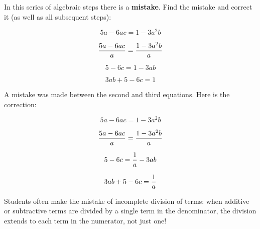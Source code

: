 

In this series of algebraic steps there is a {\bf mistake}.  Find the mistake and correct it (as well as all subsequent steps):

$$5a - 6ac = 1 - 3a^2b$$

$${{5a - 6ac} \over a} = {{1 - 3a^2b} \over a}$$

$$5 - 6c = 1 - 3ab$$

$$3ab + 5 - 6c = 1$$







A mistake was made between the second and third equations.  Here is the correction:

$$5a - 6ac = 1 - 3a^2b$$

$${{5a - 6ac} \over a} = {{1 - 3a^2b} \over a}$$

$$5 - 6c = {1 \over a} - 3ab$$

$$3ab + 5 - 6c = {1 \over a}$$







Students often make the mistake of incomplete division of terms: when additive or subtractive terms are divided by a single term in the denominator, the division extends to each term in the numerator, not just one!




